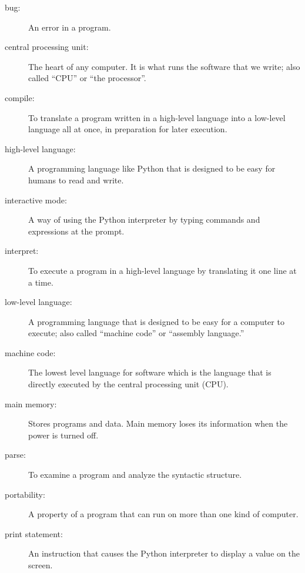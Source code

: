 \documentclass[11pt]{book}
\begin{document}
\begin{description}

\item[bug:]  An error in a program.

\item[central processing unit:] The heart of any computer.  It is what
runs the software that we write; also called ``CPU'' or ``the processor''.

\item[compile:]  To translate a program written in a high-level language
into a low-level language all at once, in preparation for later
execution.

\item[high-level language:]  A programming language like Python that
is designed to be easy for humans to read and write.

\item[interactive mode:] A way of using the Python interpreter by
typing commands and expressions at the prompt.

\item[interpret:]  To execute a program in a high-level language
by translating it one line at a time.

\item[low-level language:]  A programming language that is designed
to be easy for a computer to execute; also called ``machine code'' or
``assembly language.''

\item[machine code:]  The lowest level language for software which 
is the language that is directly executed by the central processing unit 
(CPU).

\item[main memory:] Stores programs and data.  Main memory loses 
its information when the power is turned off.

\item[parse:]  To examine a program and analyze the syntactic structure.

\item[portability:]  A property of a program that can run on more
than one kind of computer.

\item[print statement:]  An instruction that causes the Python
interpreter to display a value on the screen.


\end{description}
\end{document}
